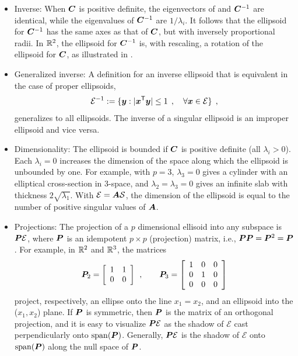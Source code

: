 \begin{itemize}
 \item Inverse: When $\bm{C}$ is positive definite, the eigenvectors of  and $\bm{C}^{-1}$ are identical, while
the
 eigenvalues of $\bm{C}^{-1}$ are $1/\lambda_i$. It follows that the ellipsoid for
 $\bm{C}^{-1}$ has the same axes as that of $\bm{C}$, but with inversely proportional radii.
 In $\mathbb{R}^{2}$, the ellipsoid for $\bm{C}^{-1}$
 is, with rescaling, a  rotation of the ellipsoid for $\bm{C}$,
 as illustrated in .

 \item Generalized inverse: A definition for an inverse ellipsoid that is equivalent in the case of proper ellipsoids,
\begin{equation}\label{eq:ellipseginv}
\mathcal{E}^{-1} := \{ \bm{y} :   |\bm{x} ^\mathsf{T} \bm{y}| \le 1 \:\: , \quad \forall \bm{x} \in \mathcal{E} \} \:\: ,
\end{equation}
generalizes to all ellipsoids. The inverse of a singular ellipsoid is an improper ellipsoid and vice versa.

 \item Dimensionality: The ellipsoid is bounded if $\bm{C}$ is positive definite (all $\lambda_i > 0$).
 Each $\lambda_i = 0$ increases the dimension of the space along which the ellipsoid is unbounded by one.
For example, with $p=3$, $\lambda_3=0$ gives a
cylinder with an elliptical cross-section in 3-space, and  $\lambda_2 = \lambda_3=0$ gives an infinite slab with thickness $2 \sqrt{\lambda_1}$. With $\mathcal{E} = \bm{A} \mathcal{S}$, the dimension of the ellipsoid is equal to the number of positive singular values of $\bm{A}$.
 \item Projections: The projection of a $p$ dimensional ellisoid into any subspace
is $\bm{P} \mathcal{E}$, where
$\bm{P}$ is an idempotent $p \times p$ (projection) matrix, i.e., $\bm{P} \bm{P}= \bm{P}^2 = \bm{P}$.
For example, in $\mathbb{R}^{2}$ and $\mathbb{R}^{3}$,
the matrices
\[
\bm{P}_2 =
\left[
\begin{array}{cc}
 1 & 1  \\
 0 & 0  \\
\end{array}
\right]
\:\: , \quad\quad
\bm{P}_3 =
\left[
\begin{array}{ccc}
 1 & 0 & 0 \\
 0 & 1 & 0 \\
 0 & 0 & 0 \\
\end{array}
\right]
\]
project, respectively, an ellipse onto the line $x_1 = x_2$, and an ellipsoid into the ($x_1, x_2$) plane.  If $\bm{P}$ is symmetric, then $\bm{P}$ is the matrix of an orthogonal projection, and it is easy to visualize  $\bm{P} \mathcal{E}$ as the shadow of  $\mathcal{E}$ cast perpendicularly onto  $\mathrm{span}(\bm{P})$. Generally,  $\bm{P} \mathcal{E}$ is the shadow of $\mathcal{E}$  onto  $\mathrm{span}(\bm{P})$ along the null space of $\bm{P}$.


\end{itemize}
